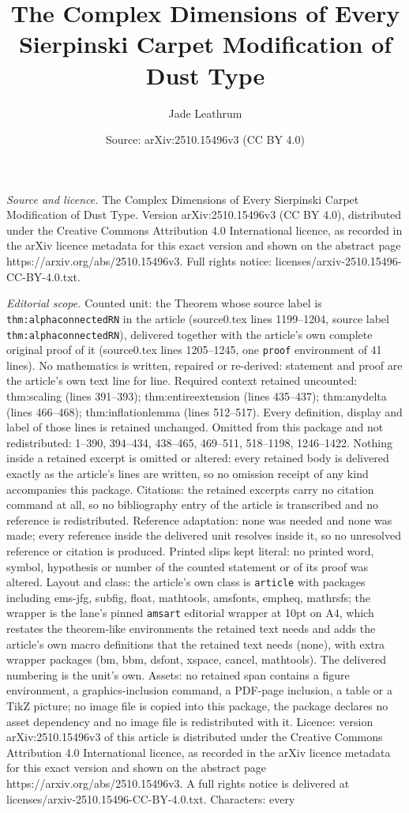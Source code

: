 \documentclass[10pt,a4paper]{amsart}
\title[The Complex Dimensions of Every Sierpinski Carpet Modificati]{The Complex Dimensions of Every Sierpinski Carpet Modification of Dust Type}
\author{Jade Leathrum}
\date{Source: arXiv:2510.15496v3 (CC BY 4.0)}
\begin{document}
\maketitle

\noindent\emph{Source and licence.} The Complex Dimensions of Every Sierpinski Carpet Modification of Dust Type. Version arXiv:2510.15496v3 (CC BY 4.0), distributed under the Creative Commons Attribution 4.0 International licence, as recorded in the arXiv licence metadata for this exact version and shown on the abstract page https://arxiv.org/abs/2510.15496v3. Full rights notice: licenses/arxiv-2510.15496-CC-BY-4.0.txt.\par\smallskip

\noindent\textit{Editorial scope.} Counted unit: the Theorem whose source label is \texttt{thm:alphaconnectedRN} in the article (source0.tex lines 1199--1204, source label \texttt{thm:alphaconnectedRN}), delivered together with the article's own complete original proof of it (source0.tex lines 1205--1245, one \texttt{proof} environment of 41 lines). No mathematics is written, repaired or re-derived: statement and proof are the article's own text line for line. Required context retained uncounted: thm:scaling (lines 391--393); thm:entireextension (lines 435--437); thm:anydelta (lines 466--468); thm:inflationlemma (lines 512--517). Every definition, display and label of those lines is retained unchanged. Omitted from this package and not redistributed: 1--390, 394--434, 438--465, 469--511, 518--1198, 1246--1422. Nothing inside a retained excerpt is omitted or altered: every retained body is delivered exactly as the article's lines are written, so no omission receipt of any kind accompanies this package. Citations: the retained excerpts carry no citation command at all, so no bibliography entry of the article is transcribed and no reference is redistributed. Reference adaptation: none was needed and none was made; every reference inside the delivered unit resolves inside it, so no unresolved reference or citation is produced. Printed slips kept literal: no printed word, symbol, hypothesis or number of the counted statement or of its proof was altered. Layout and class: the article's own class is \texttt{article} with packages including ems-jfg, subfig, float, mathtools, amsfonts, empheq, mathrsfs; the wrapper is the lane's pinned \texttt{amsart} editorial wrapper at 10pt on A4, which restates the theorem-like environments the retained text needs and adds the article's own macro definitions that the retained text needs (none), with extra wrapper packages (bm, bbm, dsfont, xspace, cancel, mathtools). The delivered numbering is the unit's own. Assets: no retained span contains a figure environment, a graphics-inclusion command, a PDF-page inclusion, a table or a TikZ picture; no image file is copied into this package, the package declares no asset dependency and no image file is redistributed with it. Licence: version arXiv:2510.15496v3 of this article is distributed under the Creative Commons Attribution 4.0 International licence, as recorded in the arXiv licence metadata for this exact version and shown on the abstract page https://arxiv.org/abs/2510.15496v3. A full rights notice is delivered at licenses/arxiv-2510.15496-CC-BY-4.0.txt. Characters: every 
\end{document}
